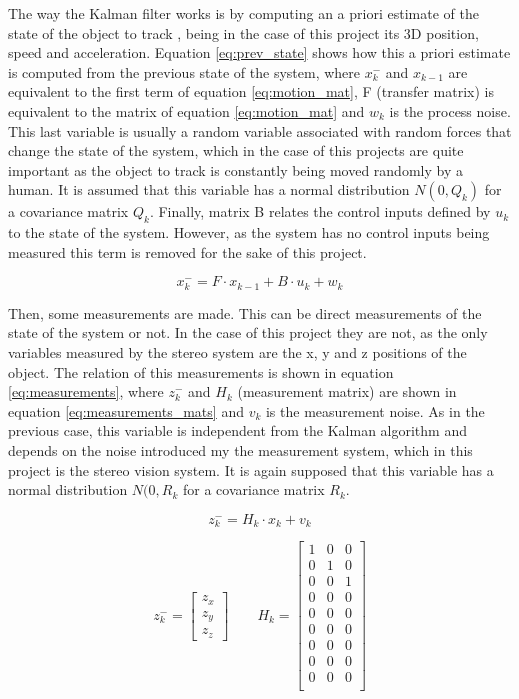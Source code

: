 The way the Kalman filter works is by computing an a priori estimate of the state of the object to track \cite{OReilly}, being in the case of this project its 3D position, speed and acceleration. Equation \ref{eq:prev_state} shows how this a priori estimate is computed from the previous state of the system, where $x_{k}^{-}$ and $x_{k-1}$ are equivalent to the first term of equation \ref{eq:motion_mat}, F (transfer matrix) is equivalent to the matrix of equation \ref{eq:motion_mat} and $w_{k}$ is the process noise. This last variable is usually a random variable associated with random forces that change the state of the system, which in the case of this projects are quite important as the object to track is constantly being moved randomly by a human. It is assumed that this variable has a normal distribution $N(0,Q_{k})$ for a covariance matrix $Q_{k}$.
Finally, matrix B relates the control inputs defined by $u_{k}$ to the state of the system. However, as the system has no control inputs being measured this term is removed for the sake of this project.

\begin{equation}
x_{k}^{-}=F·x_{k-1}+B·u_{k}+w_{k}
\label{eq:prev_state}
\end{equation}

Then, some measurements are made. This can be direct measurements of the state of the system or not. In the case of this project they are not, as the only variables measured by the stereo system are the x, y and z positions of the object. The relation of this measurements is shown in equation \ref{eq:measurements}, where $z_{k}^{-}$ and $H_{k}$ (measurement matrix) are shown in equation \ref{eq:measurements_mats} and $v_{k}$ is the measurement noise. As in the previous case, this variable is independent from the Kalman algorithm and depends on the noise introduced my the measurement system, which in this project is the stereo vision system. It is again supposed that this variable has a normal distribution $N(0,R_{k}$ for a covariance matrix $R_{k}$.

\begin{equation}
z_{k}^{-}=H_{k}·x_{k}+v_{k}
\label{eq:measurements}
\end{equation}

\begin{equation}
z_{k}^{-}=
\begin{bmatrix}
z_{x} \\ z_{y} \\ z_{z}
\end{bmatrix}
\qquad
H_{k}=
\begin{bmatrix}
1 & 0 & 0 \\
0 & 1 & 0 \\
0 & 0 & 1 \\
0 & 0 & 0 \\
0 & 0 & 0 \\
0 & 0 & 0 \\
0 & 0 & 0 \\
0 & 0 & 0 \\
0 & 0 & 0 \\
\end{bmatrix}
\label{eq:measurements_mats}
\end{equation}

